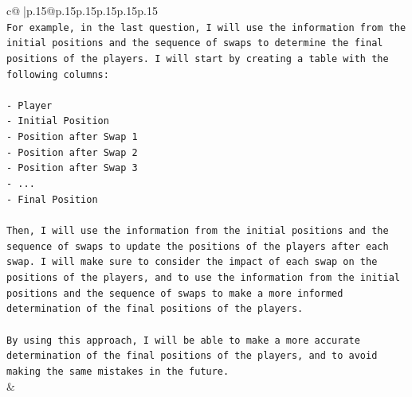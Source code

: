\documentclass{article}
\begin{document}
{\begin{supertabular}{c@{$\;$}|p{.15\linewidth}@{}p{.15\linewidth}p{.15\linewidth}p{.15\linewidth}p{.15\linewidth}p{.15\linewidth}}
{{{\\ 
\texttt{For example, in the last question, I will use the information from the initial positions and the sequence of swaps to determine the final positions of the players. I will start by creating a table with the following columns:} \\
\\ 
\texttt{{-} Player} \\
\texttt{{-} Initial Position} \\
\texttt{{-} Position after Swap 1} \\
\texttt{{-} Position after Swap 2} \\
\texttt{{-} Position after Swap 3} \\
\texttt{{-} ...} \\
\texttt{{-} Final Position} \\
\\ 
\texttt{Then, I will use the information from the initial positions and the sequence of swaps to update the positions of the players after each swap. I will make sure to consider the impact of each swap on the positions of the players, and to use the information from the initial positions and the sequence of swaps to make a more informed determination of the final positions of the players.} \\
\\ 
\texttt{By using this approach, I will be able to make a more accurate determination of the final positions of the players, and to avoid making the same mistakes in the future.} \\
            }
        }
    }
    & \\ \\

\end{supertabular}
}
\end{document}
